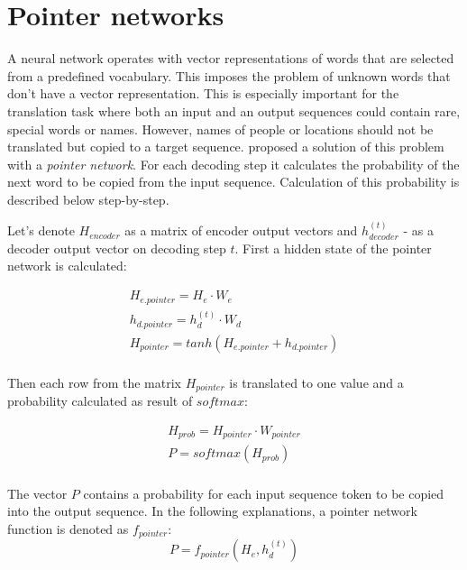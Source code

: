 \section{Pointer networks} \label{pointer}
A neural network operates with vector representations of words that are selected from a predefined vocabulary. This imposes the problem of unknown words that don't have a vector representation. This is especially important for the translation task where both an input and an output sequences could contain rare, special words or names. However, names of people or locations should not be translated but copied to a target sequence. \cite{Vinyals2015} proposed a solution of this problem with a \emph{pointer network}. For each decoding step it calculates the probability of the next word to be copied from the input sequence. Calculation of this probability is described below step-by-step.

Let's denote $H_{encoder}$ as a matrix of encoder output vectors and $h_{decoder}^{(t)}$ - as a decoder output vector on decoding step $t$. First a hidden state of the pointer network is calculated:

\begin{equation}
    \begin{gathered}
    
    H_{e.pointer} = H_e \cdot W_{e}\\
    
    h_{d.pointer} = h_{d}^{(t)} \cdot W_{d}\\
    
    H_{pointer} = tanh(H_{e.pointer} + h_{d.pointer})\\
    
    \end{gathered}
    \label{eq:pointer}
\end{equation}

Then each row from the matrix $H_{pointer}$ is translated to one value and a probability calculated as result of $softmax$:

\begin{equation}
    \begin{gathered}
    
    H_{prob} = H_{pointer} \cdot W_{pointer}\\
    
    P = softmax(H_{prob})\\
    
    \end{gathered}
\end{equation}

The vector $P$ contains a probability for each input sequence token to be copied into the output sequence. In the following explanations, a pointer network function is denoted as $f_{pointer}$:
\begin{equation}
    P = f_{pointer}(H_e, h_d^{(t)})
\end{equation}